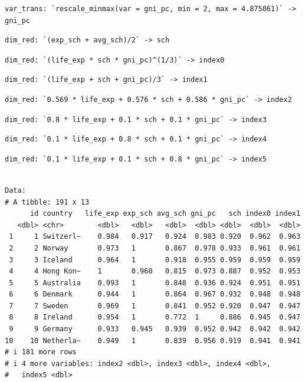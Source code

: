 \documentclass[
]{interact}
\begin{document}
\begin{verbatim}
var_trans: `rescale_minmax(var = gni_pc, min = 2, max = 4.875061)` ->
gni_pc
\end{verbatim}

\begin{verbatim}
dim_red: `(exp_sch + avg_sch)/2` -> sch
\end{verbatim}

\begin{verbatim}
dim_red: `(life_exp * sch * gni_pc)^(1/3)` -> index0
\end{verbatim}

\begin{verbatim}
dim_red: `(life_exp + sch + gni_pc)/3` -> index1
\end{verbatim}

\begin{verbatim}
dim_red: `0.569 * life_exp + 0.576 * sch + 0.586 * gni_pc` -> index2
\end{verbatim}

\begin{verbatim}
dim_red: `0.8 * life_exp + 0.1 * sch + 0.1 * gni_pc` -> index3
\end{verbatim}

\begin{verbatim}
dim_red: `0.1 * life_exp + 0.8 * sch + 0.1 * gni_pc` -> index4
\end{verbatim}

\begin{verbatim}
dim_red: `0.1 * life_exp + 0.1 * sch + 0.8 * gni_pc` -> index5
\end{verbatim}

\begin{verbatim}

Data: 
# A tibble: 191 x 13
      id country   life_exp exp_sch avg_sch gni_pc   sch index0 index1
   <dbl> <chr>        <dbl>   <dbl>   <dbl>  <dbl> <dbl>  <dbl>  <dbl>
 1     1 Switzerl~    0.984   0.917   0.924  0.983 0.920  0.962  0.963
 2     2 Norway       0.973   1       0.867  0.978 0.933  0.961  0.961
 3     3 Iceland      0.964   1       0.918  0.955 0.959  0.959  0.959
 4     4 Hong Kon~    1       0.960   0.815  0.973 0.887  0.952  0.953
 5     5 Australia    0.993   1       0.848  0.936 0.924  0.951  0.951
 6     6 Denmark      0.944   1       0.864  0.967 0.932  0.948  0.948
 7     7 Sweden       0.969   1       0.841  0.952 0.920  0.947  0.947
 8     8 Ireland      0.954   1       0.772  1     0.886  0.945  0.947
 9     9 Germany      0.933   0.945   0.939  0.952 0.942  0.942  0.942
10    10 Netherla~    0.949   1       0.839  0.956 0.919  0.941  0.941
# i 181 more rows
# i 4 more variables: index2 <dbl>, index3 <dbl>, index4 <dbl>,
#   index5 <dbl>
\end{verbatim}
\end{document}
